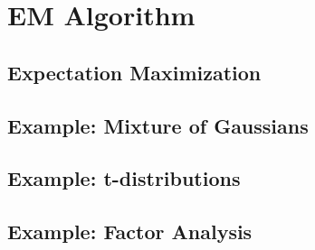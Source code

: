 
\chapter{EM Algorithm}
\label{chapter9}

\section{Expectation Maximization}

\section{Example: Mixture of Gaussians}

\section{Example: t-distributions}

\section{Example: Factor Analysis}